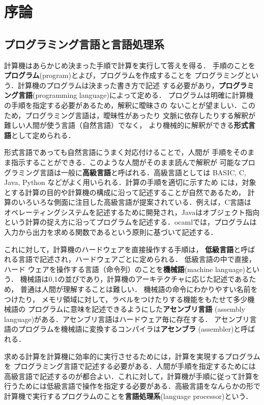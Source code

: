 \documentclass[a4j,dvipdfmx]{jbook}
\begin{document}
\chapter{序論}
\section{プログラミング言語と言語処理系}
計算機はあらかじめ決まった手順で計算を実行して答えを得る．
手順のことを{\bf プログラム}(program)とよび，プログラムを作成することを
プログラミングという．計算機のプログラムは決まった書き方で記述
する必要があり，{\bf プログラミング言語}(programming language)によって定める．
プログラムは明確に計算機の手順を指定する必要があるため，解釈に曖昧さの
ないことが望ましい．このため，プログラミング言語は，曖昧性があったり
文脈に依存したりする解釈が難しい人間が使う言語（自然言語）でなく，
より機械的に解釈ができる{\bf 形式言語}として定められる．

形式言語であっても自然言語にうまく対応付けることで，人間が
手順をそのまま指示することができる．このような人間がそのまま読んで解釈が
可能なプログラミング言語は一般に{\bf 高級言語}と呼ばれる．高級言語としては
BASIC, C, Java, Python などがよく用いられる．計算の手順を適切に示すため
には，対象とする計算の目的や計算機の構成に沿って記述することが自然であるため，
計算のいろいろな側面に注目した高級言語が提案されている．例えば，C言語は
オペレーティングシステムを記述するために開発され，Javaはオブジェクト指向
という計算の捉え方に沿ってプログラムを記述する．ocamlでは，プログラムは
入力から出力を求める関数であるという原則に基づいて記述する．

これに対して，計算機のハードウェアを直接操作する手順は，
{\bf 低級言語}と呼ばれる言語で記述され，ハードウェアごとに定められる．
低級言語の中で直接，ハード
ウェアを操作する言語（命令列）のことを{\bf 機械語}(machine language)という．
機械語は0,1の並びであり，計算機のアーキテクチャに応じた記述であるため，
普通は人間が理解することは難しい．
機械語の命令にわかりやすい名前をつけたり，
メモリ領域に対して，ラベルをつけたりする機能をもたせて多少機械語の
プログラムに意味を記述できるようにした{\bf アセンブリ言語}
(assembly language)がある．アセンブリ言語はハードウェア毎に存在する．
アセンブリ言語のプログラムを機械語に変換するコンパイラは{\bf アセンブラ}
(assembler)と呼ばれる．

求める計算を計算機に効率的に実行させるためには，計算を実現するプログラムを
プログラミング言語で記述する必要がある．人間が手順を指定するためには
高級言語で記述するのが都合よい．これに対して，計算機が手順に従って計算を
行うためには低級言語で操作を指定する必要がある．高級言語をなんらかの形で
計算機で実行するプログラムのことを{\bf 言語処理系}(language processor)という．
\end{document}
